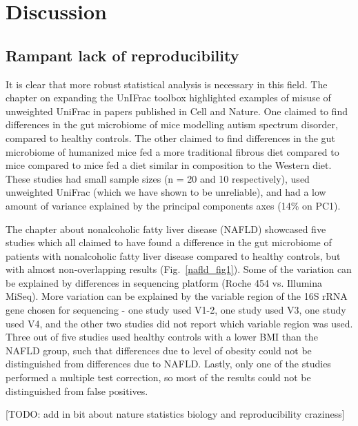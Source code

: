 \chapter{Discussion}

\section{Rampant lack of reproducibility}
It is clear that more robust statistical analysis is necessary in this field. The chapter on expanding the UnIFrac toolbox highlighted examples of misuse of unweighted UniFrac in papers published in Cell and Nature. One claimed to find differences in the gut microbiome of mice modelling autism spectrum disorder, compared to healthy controls. The other claimed to find differences in the gut microbiome of humanized mice fed a more traditional fibrous diet compared to mice compared to mice fed a diet similar in composition to the Western diet. These studies had small sample sizes (n = 20 and 10 respectively), used unweighted UniFrac (which we have shown to be unreliable), and had a low amount of variance explained by the principal components axes (14\% on PC1).

The chapter about nonalcoholic fatty liver disease (NAFLD) showcased five studies which all claimed to have found a difference in the gut microbiome of patients with nonalcoholic fatty liver disease compared to healthy controls, but with almost non-overlapping results (Fig.~\ref{nafld_fig1}). Some of the variation can be explained by differences in sequencing platform (Roche 454 vs. Illumina MiSeq). More variation can be explained by the variable region of the 16S rRNA gene chosen for sequencing - one study used V1-2, one study used V3, one study used V4, and the other two studies did not report which variable region was used. Three out of five studies used healthy controls with a lower BMI than the NAFLD group, such that differences due to level of obesity could not be distinguished from differences due to NAFLD. Lastly, only one of the studies performed a multiple test correction, so most of the results could not be distinguished from false positives.

[TODO: add in bit about nature statistics biology and reproducibility craziness]

